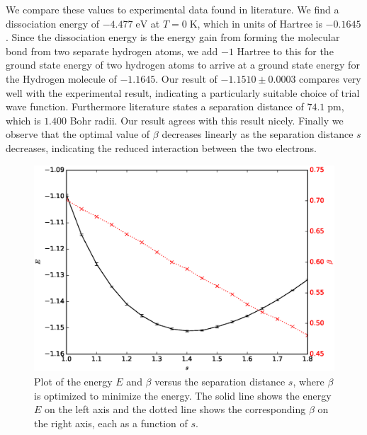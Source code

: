 \documentclass[twoside]{article}
\newcommand{\unit}[1]{\ensuremath{\; \mathrm{#1}}}
\begin{document}
We compare these values to experimental data found in literature\cite{ref_NIST}\cite{ref_Grinter}. We find a dissociation energy of $-4.477 \unit{eV}$ at $T=0 \unit{K}$, which in units of Hartree is $-0.1645$. Since the dissociation energy is the energy gain from forming the molecular bond from two separate hydrogen atoms, we add $-1$ Hartree to this for the ground state energy of two hydrogen atoms to arrive at a ground state energy for the Hydrogen molecule of $-1.1645$. Our result of $-1.1510 \pm 0.0003$ compares very well with the experimental result, indicating a particularly suitable choice of trial wave function. Furthermore literature states a separation distance of $74.1 \unit{pm}$, which is $1.400$ Bohr radii. Our result agrees with this result nicely. Finally we observe that the optimal value of $\beta$ decreases linearly as the separation distance $s$ decreases, indicating the reduced interaction between the two electrons.

\begin{figure}
	\centering
	\includegraphics[width=0.8\linewidth]{figs/EvsS_optimalBeta.eps}
	\caption{Plot of the energy $E$ and $\beta$ versus the separation distance $s$, where $\beta$ is optimized to minimize the energy. The solid line shows the energy $E$ on the left axis and the dotted line shows the corresponding $\beta$ on the right axis, each as a function of $s$.}
	\label{fig:EvsS_optimalBeta}
\end{figure}
\end{document}
